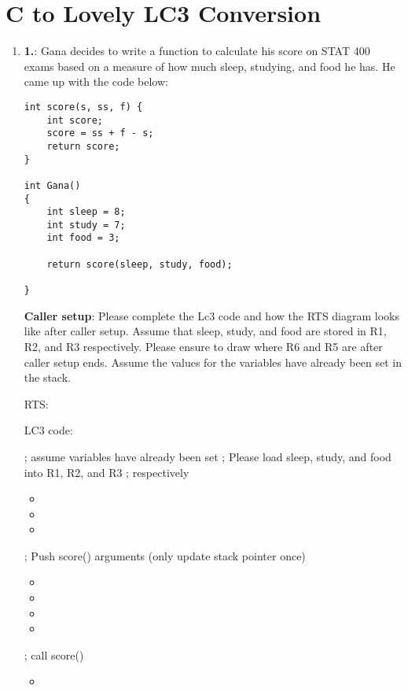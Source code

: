\documentclass{article}
\begin{document}
\section{C to Lovely LC3 Conversion}
\begin{enumerate}[label=(\alph*), itemsep = 120pt]
    \item \textbf{1.}: Gana decides to write a function to calculate his score on STAT 400 exams based on a measure of how much sleep, studying, and food he has. He came up with the code below:

        \begin{lstlisting}[style=CStyle]
int score(s, ss, f) {
    int score;
    score = ss + f - s;
    return score;
}

int Gana()
{
    int sleep = 8;
    int study = 7;
    int food = 3;

    return score(sleep, study, food);
    
} \end{lstlisting}
\textbf{Caller setup}: Please complete the Lc3 code and how the RTS diagram looks like after caller setup. Assume that sleep, study, and food are stored in R1, R2, and R3 respectively. Please ensure to draw where R6 and R5 are after caller setup ends. Assume the values for the variables have already been set in the stack.

RTS:
\newline
\newline
\newline
\newline
\newline
\newline
\newline
\newline
\newline
\newline
\newline


LC3 code: 

; assume variables have already been set
; Please load sleep, study, and food into R1, R2, and R3 
 ; respectively 

\begin{itemize}
    \item 
    \item 
    \item
\end{itemize}
; Push score() arguments (only update stack pointer once)
\begin{itemize}
    \item 
    \item 
    \item
    \item
\end{itemize}
; call score()
\begin{itemize}
    \item 
\end{itemize}



\end{enumerate}
\end{document}
